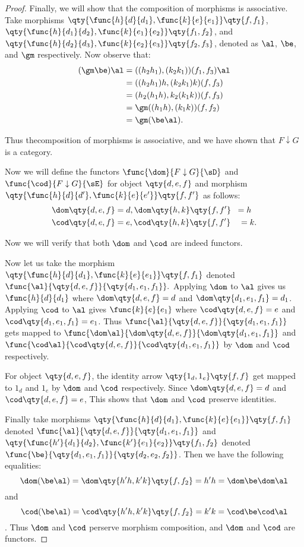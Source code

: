 \documentclass[main.tex]{subfiles}
\begin{document}
\begin{proof}
	Finally, we will show that the composition of morphisms is associative. Take
	morphisms
	$\qty{\func{h}{d}{d_1},\func{k}{e}{e_1}} \qty{f,f_1}$,
	$\qty{\func{h}{d_1}{d_2},\func{k}{e_1}{e_2}} \qty{f_1,f_2}$, and
	$\qty{\func{h}{d_2}{d_3},\func{k}{e_2}{e_3}} \qty{f_2,f_3}$, denoted as
	$\al$, $\be$, and $\gm$ respectively. Now observe that:
	\begin{align*}
	(\gm\be)\al&=((h_2h_1),(k_2 k_1))(f_1,f_3) \al\\
	&=((h_2 h_1) h,(k_2 k_1) k)(f,f_3)\\
	&=(h_2(h_1 h),k_2(k_1 k))(f,f_3)\\	
	&=\gm((h_1 h),(k_1 k))(f,f_2)\\
	&=\gm(\be \al).
	\end{align*}
	 
	Thus thecomposition of morphisms is associative, and we have shown
	that $F \downarrow G$ is a category.

	Now we will define the functors $\func{\dom}{F \downarrow G}{\sD}$ and
	$\func{\cod}{F \downarrow G}{\sE}$ for object $\qty{d,e,f}$ and morphism
	$\qty{\func{h}{d}{d'},\func{k}{e}{e'}} \qty{f,f'}$ as follows: 
	\begin{align*}
	\dom\qty{d,e,f} &= d, \dom\qty{h,k}\qty{f,f'} \;\;= h \\
	\cod\qty{d,e,f} &= e, \cod\qty{h,k}\qty{f,f'} \quad= k. 
	\end{align*}
	
	Now we will verify that both $\dom$ and $\cod$ are indeed functors.

	Now let us take the morphism $\qty{\func{h}{d}{d_1},\func{k}{e}{e_1}}
	\qty{f,f_1}$  denoted $\func{\al}{\qty{d,e,f}}{\qty{d_1,e_1,f_1}}.$ 
	Applying $\dom$ to $\al$ gives us $\func{h}{d}{d_{1}}$ where $\dom\qty{d,e,f}
	= d$ and $\dom\qty{d_1,e_1,f_1} = d_1$. Applying $\cod$ to $\al$ gives
	$\func{k}{e}{e_{1}}$ where $\cod\qty{d,e,f} = e$ and $\cod\qty{d_1,e_1,f_1} =
	e_1$. Thus $\func{\al}{\qty{d,e,f}}{\qty{d_1,e_1,f_1}}$ gets mapped to
	$\func{\dom\al}{\dom\qty{d,e,f}}{\dom\qty{d_1,e_1,f_1}}$ and
	$\func{\cod\al}{\cod\qty{d,e,f}}{\cod\qty{d_1,e_1,f_1}}$ by $\dom$ and $\cod$
	respectively.

	For object $\qty{d,e,f}$, the identity arrow $\qty{1_{d},1_{e}}\qty{f,f}$
	get mapped to $1_d$ and $1_e$ by $\dom$ and $\cod$ respectively. Since
	$\dom\qty{d,e,f} = d$ and $\cod\qty{d,e,f} = e$, This shows that $\dom$ and
	$\cod$ preserve identities.

	Finally take morphisms $\qty{\func{h}{d}{d_1},\func{k}{e}{e_1}} \qty{f,f_1}$
	denoted $\func{\al}{\qty{d,e,f}}{\qty{d_1,e_1,f_1}}$ and
	$\qty{\func{h'}{d_1}{d_2},\func{k'}{e_1}{e_2}} \qty{f_1,f_2}$   denoted
	$\func{\be}{\qty{d_1,e_1,f_1}}{\qty{d_2,e_2,f_2}}$. Then we have the
	following equalities:
	\[\dom(\be \al) = \dom\qty{h'  h,k'  k}\qty{f,f_2} =h'
	 h = \dom\be  \dom\al\] and
	\[\cod(\be \al) = \cod \qty{h' h,k' k}\qty{f,f_2}=  k'
	 k = \cod\be\cod\al\]. Thus $\dom$ and $\cod$ perserve morphism
	composition, and $\dom$ and $\cod$ are functors.
\end{proof}
\end{document}
